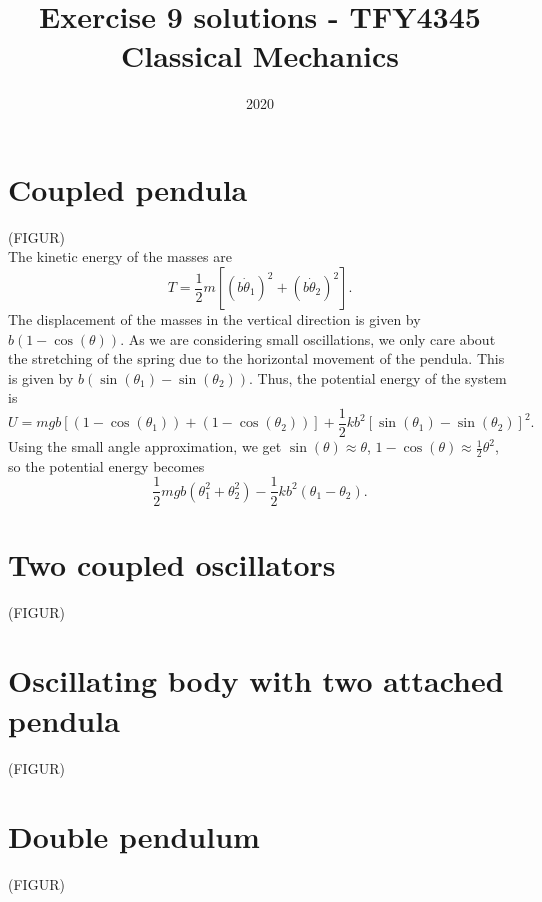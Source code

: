 \documentclass{article}
\title{Exercise 9 solutions - TFY4345 Classical Mechanics}
\date{2020}
\begin{document}
    \maketitle
    \section{Coupled pendula}
    (FIGUR) \\
    The kinetic energy of the masses are 
    \begin{equation*}
        T = \frac{1}{2}m\left[(b \dot \theta_1)^2 + (b \dot \theta_2)^2\right].
    \end{equation*}
    The displacement of the masses in the vertical direction is given by $b(1 - \cos(\theta))$. As we are considering small oscillations, we only care about the stretching of the spring due to the horizontal movement of the pendula. This is given by $b (\sin(\theta_1) - \sin(\theta_2))$. Thus, the potential energy of the system is
    \begin{equation*}
        U = mgb\left[(1 - \cos(\theta_1)) + (1 - \cos(\theta_2))\right] + \frac{1}{2}kb^2\left[\sin(\theta_1) - \sin(\theta_2)\right]^2.
    \end{equation*}
    Using the small angle approximation, we get $\sin(\theta) \approx \theta$, $1 - \cos(\theta) \approx \frac{1}{2} \theta^2$, so the potential energy becomes
    \begin{equation*}
        \frac{1}{2} mgb (\theta_1^2 + \theta_2^2) - \frac{1}{2}kb^2(\theta_1 - \theta_2).
    \end{equation*}

    \section{Two coupled oscillators}
    (FIGUR) \\

    \section{Oscillating body with two attached pendula}
    (FIGUR) \\

    \section{Double pendulum}
    (FIGUR) \\
\end{document}
